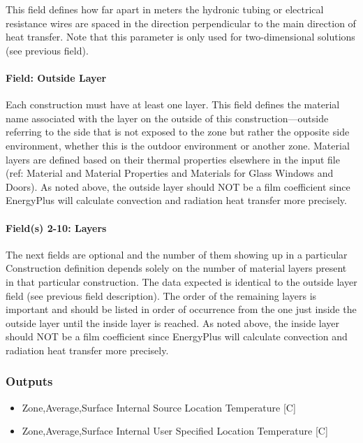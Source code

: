 This field defines how far apart in meters the hydronic tubing or electrical resistance wires are spaced in the direction perpendicular to the main direction of heat transfer. Note that this parameter is only used for two-dimensional solutions (see previous field).

\paragraph{Field: Outside Layer}\label{field-outside-layer-1}

Each construction must have at least one layer. This field defines the material name associated with the layer on the outside of this construction---outside referring to the side that is not exposed to the zone but rather the opposite side environment, whether this is the outdoor environment or another zone. Material layers are defined based on their thermal properties elsewhere in the input file (ref: Material and Material Properties and Materials for Glass Windows and Doors). As noted above, the outside layer should NOT be a film coefficient since EnergyPlus will calculate convection and radiation heat transfer more precisely.

\paragraph{Field(s) 2-10: Layers}\label{fields-2-10-layers-1}

The next fields are optional and the number of them showing up in a particular Construction definition depends solely on the number of material layers present in that particular construction. The data expected is identical to the outside layer field (see previous field description). The order of the remaining layers is important and should be listed in order of occurrence from the one just inside the outside layer until the inside layer is reached. As noted above, the inside layer should NOT be a film coefficient since EnergyPlus will calculate convection and radiation heat transfer more precisely.

\subsubsection{Outputs}\label{outputs-36-1}

\begin{itemize}
\item  Zone,Average,Surface Internal Source Location Temperature [C]
\item  Zone,Average,Surface Internal User Specified Location Temperature [C]
\end{itemize}

